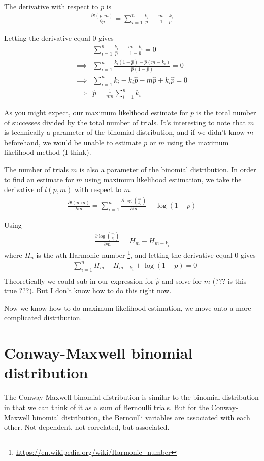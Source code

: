\documentclass[a4paper,12pt]{article}
\theoremstyle{definition}
\newcommand{\pdiff}[2]{\frac{\partial #1}{\partial #2}} %
\begin{document}
The derivative with respect to $p$ is
\begin{align}
  \pdiff{l(p, m)}{p} = \sum_{i=1}^n \frac{k_i}{p} - \frac{m - k_i}{1-p}
\end{align}

Letting the derivative equal $0$ gives
\begin{align}
  & \sum_{i=1}^n \frac{k_i}{\hat{p}} - \frac{m - k_i}{1-\hat{p}} = 0 \\
  \implies & \sum_{i=1}^n \frac{k_i (1-\hat{p}) - \hat{p}(m - k_i)}{\hat{p}(1-\hat{p})} = 0 \\
  \implies & \sum_{i=1}^n k_i - k_i \hat{p} - m \hat{p} + k_i \hat{p} = 0 \\
  \implies & \hat{p} = \frac{1}{nm} \sum_{i=1}^n k_i
\end{align}

As you might expect, our maximum likelihood estimate for $p$ is the total number of successes divided by the total number of trials. It's interesting to note that $m$ is technically a parameter of the binomial distribution, and if we didn't know $m$ beforehand, we would be unable to estimate $p$ or $m$ using the maximum likelihood method (I think).

The number of trials $m$ is also a parameter of the binomial distribution. In order to find an estimate for $m$ using maximum likelihood estimation, we take the derivative of $l(p, m)$ with respect to $m$.
\begin{align}
  \pdiff{l(p, m)}{m} = \sum_{i=1}^n \pdiff{\log{\binom{m}{k_i}}}{m} + \log(1-p)
\end{align}

Using 
\begin{align}
  \pdiff{\log \binom{m}{k_i}}{m} = H_m - H_{m - k_i}
\end{align}
where $H_n$ is the $n$th Harmonic number \footnote{\url{https://en.wikipedia.org/wiki/Harmonic_number}}, and letting the derivative equal 0 gives 
\begin{align}
   & \sum_{i=1}^n H_m - H_{m - k_i} + \log (1-p) = 0 \\ 
\end{align}
Theoretically we could sub in our expression for $\hat{p}$ and solve for $m$ (??? is this true ???). But I don't know how to do this right now.

Now we know how to do maximum likelihood estimation, we move onto a more complicated distribution.

\section{Conway-Maxwell binomial distribution}
The Conway-Maxwell binomial distribution is similar to the binomial distribution in that we can think of it as a sum of Bernoulli trials. But for the Conway-Maxwell binomial distribution, the Bernoulli variables are associated with each other. Not dependent, not correlated, but associated. 
\end{document}
